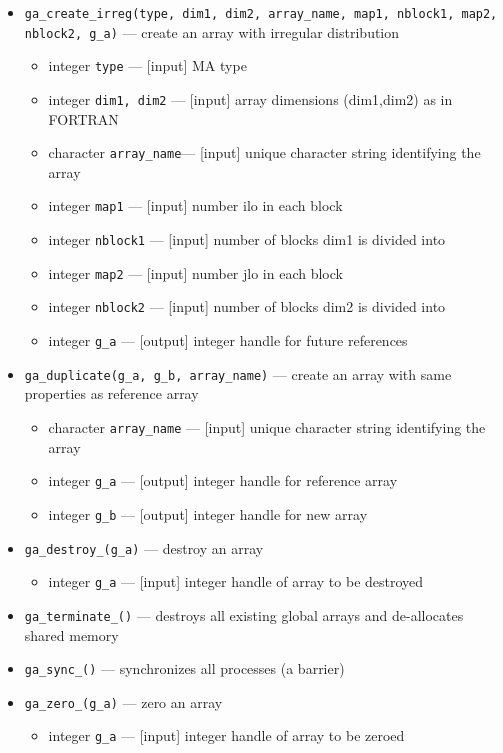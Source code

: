 \begin{itemize}
\item {\tt ga\_create\_irreg(type, dim1, dim2, array\_name, map1, nblock1,
map2, nblock2, g\_a)} --- create an array with irregular
  distribution
\begin{itemize}
\item     integer {\tt type}        --- [input] MA type
\item     integer {\tt dim1, dim2}  --- [input] array dimensions (dim1,dim2) as in FORTRAN
\item     character {\tt array\_name}--- [input] unique character string identifying the array
\item     integer {\tt map1}        --- [input] number ilo in each block
\item     integer {\tt nblock1}     --- [input] number of blocks dim1 is divided into
\item     integer {\tt map2}        --- [input] number jlo in each block
\item     integer {\tt nblock2}     --- [input] number of blocks dim2 is divided into
\item     integer {\tt g\_a}        --- [output] integer handle for future references
\end{itemize}

\item {\tt ga\_duplicate(g\_a, g\_b, array\_name)} --- create an array with same properties as reference
  array
\begin{itemize}
\item     character {\tt array\_name} --- [input] unique character string identifying the array
\item     integer {\tt g\_a}         --- [output] integer handle for reference array
\item     integer {\tt g\_b}         --- [output] integer handle for new array
\end{itemize}

\item {\tt ga\_destroy\_(g\_a)} --- destroy an array
\begin{itemize}
\item     integer {\tt g\_a}         --- [input] integer handle of array to be destroyed
\end{itemize}

\item {\tt ga\_terminate\_()} --- destroys all existing global arrays 
and de-allocates shared memory
\item {\tt ga\_sync\_()} --- synchronizes all processes (a barrier)
\item {\tt ga\_zero\_(g\_a)} --- zero an array
\begin{itemize}
\item     integer {\tt g\_a}         --- [input] integer handle of array to be zeroed
\end{itemize}


\end{itemize}
